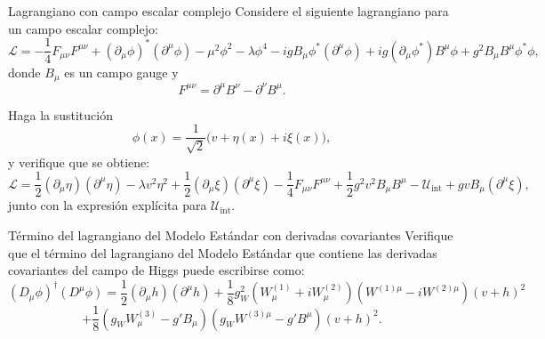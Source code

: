 \begin{Ejercicio}{Lagrangiano con campo escalar complejo}\label{Ej:19}
Considere el siguiente lagrangiano para un campo escalar complejo:
\[
\mathcal{L} = -\frac{1}{4}F_{\mu\nu}F^{\mu\nu}
+ (\partial_\mu \phi)^\ast (\partial^\mu \phi)
- \mu^2 \phi^2 - \lambda \phi^4
- i g B_\mu \phi^\ast (\partial^\mu \phi)
+ i g (\partial_\mu \phi^\ast) B^\mu \phi
+ g^2 B_\mu B^\mu \phi^\ast \phi,
\]
donde $B_\mu$ es un campo gauge y 
\[
F^{\mu\nu} = \partial^\mu B^\nu - \partial^\nu B^\mu.
\]

\medskip
Haga la sustitución 
\[
\phi(x) = \frac{1}{\sqrt{2}}\big(v + \eta(x) + i\xi(x)\big),
\]
y verifique que se obtiene:
\[
\mathcal{L} =
\frac{1}{2}(\partial_\mu \eta)(\partial^\mu \eta)
- \lambda v^2 \eta^2
+ \frac{1}{2}(\partial_\mu \xi)(\partial^\mu \xi)
- \frac{1}{4}F_{\mu\nu}F^{\mu\nu}
+ \frac{1}{2}g^2 v^2 B_\mu B^\mu
- \mathcal{U}_{\text{int}}
+ g v B_\mu (\partial^\mu \xi),
\]
junto con la expresión explícita para $\mathcal{U}_{\text{int}}$.
\end{Ejercicio}

\begin{Ejercicio}{Término del lagrangiano del Modelo Estándar con derivadas covariantes}\label{Ej:20}
Verifique que el término del lagrangiano del Modelo Estándar que contiene las derivadas covariantes del campo de Higgs puede escribirse como:
\[
(D_\mu \phi)^\dagger (D^\mu \phi)
= \frac{1}{2}(\partial_\mu h)(\partial^\mu h)
+ \frac{1}{8} g_W^2 (W_\mu^{(1)} + iW_\mu^{(2)})(W^{(1)\mu} - iW^{(2)\mu})(v+h)^2
\]
\[
+ \frac{1}{8}(g_W W_\mu^{(3)} - g' B_\mu)(g_W W^{(3)\mu} - g' B^\mu)(v+h)^2.
\]
\end{Ejercicio}

